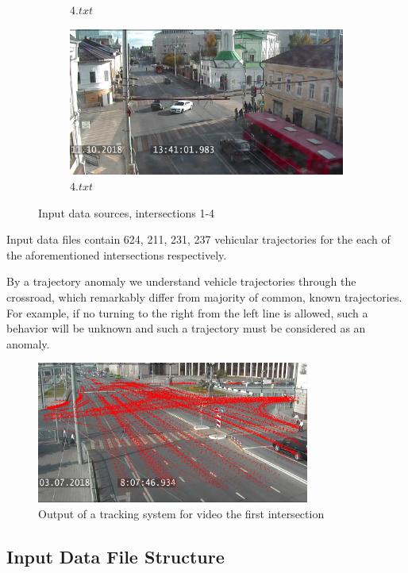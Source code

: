 \begin{figure}[!htb]
\begin{subfigure}[!htb]{0.48\textwidth}
		\caption{$4.txt$}
		\label{fig:is_3}
	\end{subfigure}
	\hfill
	\begin{subfigure}[!htb]{0.48\textwidth}
		\centering{}
		\includegraphics[width=\textwidth]{images/is-4.jpg}
		\caption{$4.txt$}
		\label{fig:is_4}
	\end{subfigure}
	\caption{Input data sources, intersections 1-4}
	\label{fig:is_all}
\end{figure}

Input data files contain 624, 211, 231, 237 vehicular trajectories for the each of the aforementioned intersections respectively.

By a trajectory anomaly we understand vehicle trajectories through the crossroad, which remarkably differ from majority of common, known trajectories. For example, if no turning to the right from the left line is allowed, such a behavior will be unknown and such a trajectory must be considered as an anomaly.

\begin{figure}[!htb]
	\centering{}
	\includegraphics[width=0.8\textwidth]{images/tr-p.png}
	\caption{Output of a tracking system for video the first intersection}
	\label{fig:tr_p}
\end{figure}

\subsection{Input Data File Structure}

